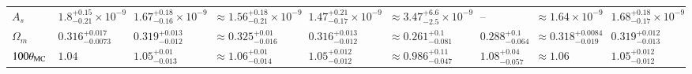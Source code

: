 \begin{appendix}
\begin{landscape}
\begin{table}
\begin{center}
\begin{tabular}{lllllllll}
$A_s     $& $1.8^{+0.15}_{-0.21}\times 10^{-9}$ & $1.67^{+0.18}_{-0.16}\times 10^{-9}$& $\approx 1.56^{+0.18}_{-0.21}\times 10^{-9}$ & $1.47^{+0.21}_{-0.17}\times 10^{-9}$& $\approx 3.47^{+6.6}_{-2.5}\times 10^{-9}$ & --& $\approx 1.64\times 10^{-9}$ & $1.68^{+0.18}_{-0.17}\times 10^{-9}$\\
$\Omega_m$& $0.316^{+0.017}_{-0.0073}$ & $0.319^{+0.013}_{-0.012}$& $\approx 0.325^{+0.01}_{-0.016}$ & $0.316^{+0.013}_{-0.012}$& $\approx 0.261^{+0.1}_{-0.081}$ & $0.288^{+0.1}_{-0.064}$& $\approx 0.318^{+0.0084}_{-0.019}$ & $0.319^{+0.012}_{-0.013}$\\
$100\theta_{\rm MC}$& $1.04$ & $1.05^{+0.01}_{-0.013}$& $\approx 1.06^{+0.01}_{-0.014}$ & $1.05^{+0.012}_{-0.012}$& $\approx 0.986^{+0.11}_{-0.047}$ & $1.08^{+0.04}_{-0.057}$& $\approx 1.06$ & $1.05^{+0.012}_{-0.012}$\\
    \bottomrule
\end{tabular}

\end{center}
\end{table}
\end{landscape}

\end{appendix}